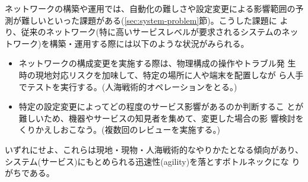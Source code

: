 ネットワークの構築や運用では、自動化の難しさや設定変更による影響範囲の予
測が難しいといった課題がある(\ref{sec:system-problem}節)。こうした課題に
より、従来のネットワーク(特に高いサービスレベルが要求されるシステムのネッ
トワーク)を構築・運用する際には以下のような状況がみられる。
\begin{itemize}
 \item ネットワークの構成変更を実施する際は、物理構成の操作やトラブル発
       生時の現地対応リスクを加味して、特定の場所に人や端末を配置しなが
       ら人手でテストを実行する。(人海戦術的オペレーションをとる。)
 \item 特定の設定変更によってどの程度のサービス影響があるのか判断するこ
       とが難しいため、機器やサービスの知見者を集めて、変更した場合の影
       響検討をくりかえしおこなう。(複数回のレビューを実施する。)
\end{itemize}
いずれにせよ、これらは現地・現物・人海戦術的なやりかたとなる傾向があり、
システム(サービス)にもとめられる迅速性(agility)を落とすボトルネックにな
りがちである。

